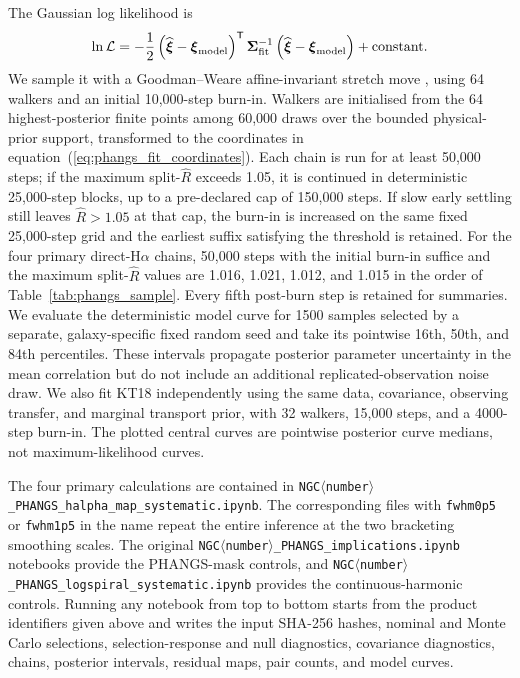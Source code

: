 \documentclass[fleqn,usenatbib]{mnras}
\begin{document}
The Gaussian log likelihood is
\begin{equation}
    \ln{\cal L}=-\frac{1}{2}
    \left(\widehat{\boldsymbol\xi}-\boldsymbol\xi_{\rm model}\right)^{\mathsf T}
    \boldsymbol\Sigma_{\rm fit}^{-1}
    \left(\widehat{\boldsymbol\xi}-\boldsymbol\xi_{\rm model}\right)
    +\mathrm{constant}.
    \label{eq:phangs_likelihood}
\end{equation}
We sample it with a Goodman--Weare affine-invariant stretch move \citep{Foreman-Mackey13a}, using 64 walkers and an initial 10,000-step burn-in.  Walkers are initialised from the 64 highest-posterior finite points among 60,000 draws over the bounded physical-prior support, transformed to the coordinates in equation~(\ref{eq:phangs_fit_coordinates}).  Each chain is run for at least 50,000 steps; if the maximum split-$\widehat R$ exceeds 1.05, it is continued in deterministic 25,000-step blocks, up to a pre-declared cap of 150,000 steps.  If slow early settling still leaves $\widehat R>1.05$ at that cap, the burn-in is increased on the same fixed 25,000-step grid and the earliest suffix satisfying the threshold is retained.  For the four primary direct-H$\alpha$ chains, 50,000 steps with the initial burn-in suffice and the maximum split-$\widehat R$ values are 1.016, 1.021, 1.012, and 1.015 in the order of Table~\ref{tab:phangs_sample}.  Every fifth post-burn step is retained for summaries.  We evaluate the deterministic model curve for 1500 samples selected by a separate, galaxy-specific fixed random seed and take its pointwise 16th, 50th, and 84th percentiles.  These intervals propagate posterior parameter uncertainty in the mean correlation but do not include an additional replicated-observation noise draw.  We also fit KT18 independently using the same data, covariance, observing transfer, and marginal transport prior, with 32 walkers, 15,000 steps, and a 4000-step burn-in.  The plotted central curves are pointwise posterior curve medians, not maximum-likelihood curves.

The four primary calculations are contained in \texttt{NGC$\langle$number$\rangle$\_PHANGS\_\allowbreak halpha\_map\_\allowbreak systematic.ipynb}.  The corresponding files with \texttt{fwhm0p5} or \texttt{fwhm1p5} in the name repeat the entire inference at the two bracketing smoothing scales.  The original \texttt{NGC$\langle$number$\rangle$\_PHANGS\_\allowbreak implications.ipynb} notebooks provide the PHANGS-mask controls, and \texttt{NGC$\langle$number$\rangle$\_PHANGS\_\allowbreak logspiral\_systematic.ipynb} provides the continuous-harmonic controls.  Running any notebook from top to bottom starts from the product identifiers given above and writes the input SHA-256 hashes, nominal and Monte Carlo selections, selection-response and null diagnostics, covariance diagnostics, chains, posterior intervals, residual maps, pair counts, and model curves.
\end{document}
